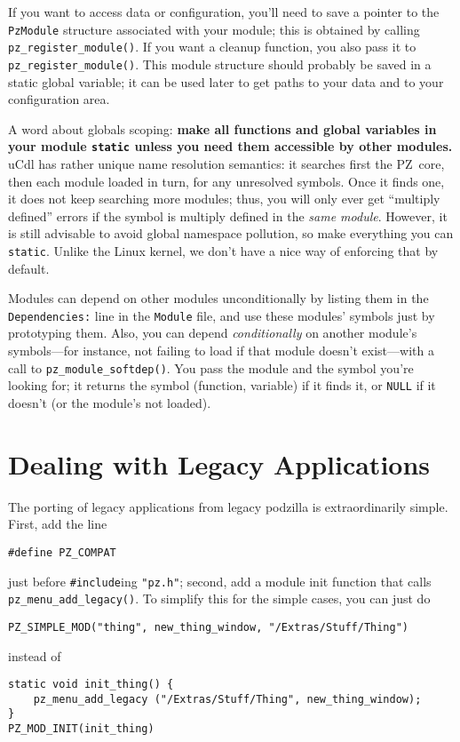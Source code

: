 \documentclass[12pt,letterpaper]{report}
\def\pz{{\footnotesize PZ}}
\let\ttt\tt
\def\tt{\def\_{{\ttt\char`\_}}\ttt}
\begin{document}
If you want to access data or configuration, you'll need to save a pointer to the \verb|PzModule|
structure associated with your module; this is obtained by calling \verb|pz_register_module()|.
If you want a cleanup function, you also pass it to \verb|pz_register_module()|. This module
structure should probably be saved in a static global variable; it can be used later to get
paths to your data and to your configuration area.

A word about globals scoping: {\bf make all functions and global variables in your module
\verb|static| unless you need them accessible by other modules.}
uCdl has rather unique name resolution semantics: it searches first the \pz\ core, then each
module loaded in turn, for any unresolved symbols. Once it finds one, it does not keep searching
more modules; thus, you will only ever get ``multiply defined'' errors if the symbol is multiply
defined in the {\it same module}. However, it is still advisable to avoid global namespace pollution,
so make everything you can \verb|static|. Unlike the Linux kernel, we don't have a nice
way of enforcing that by default.

Modules can depend on other modules unconditionally by listing them in the {\tt Dependencies:} line
in the \verb|Module| file, and use these modules' symbols just by prototyping them. Also, you
can depend {\it conditionally} on another module's symbols---for instance, not failing to load if that
module doesn't exist---with a call to \verb|pz_module_softdep()|. You pass the module and the symbol
you're looking for; it returns the symbol (function, variable) if it finds it, or \verb|NULL| if
it doesn't (or the module's not loaded).

\section{Dealing with Legacy Applications}
The porting of legacy applications from legacy podzilla is extraordinarily simple. First, add the
line
\begin{verbatim}
#define PZ_COMPAT
\end{verbatim}
just before \verb|#include|ing \verb|"pz.h"|; second, add a module init function that calls
\verb|pz_menu_add_legacy()|. To simplify this for the simple cases, you can just do
\begin{verbatim}
PZ_SIMPLE_MOD("thing", new_thing_window, "/Extras/Stuff/Thing")
\end{verbatim}
instead of
\begin{verbatim}
static void init_thing() {
    pz_menu_add_legacy ("/Extras/Stuff/Thing", new_thing_window);
}
PZ_MOD_INIT(init_thing)
\end{verbatim}
\end{document}
